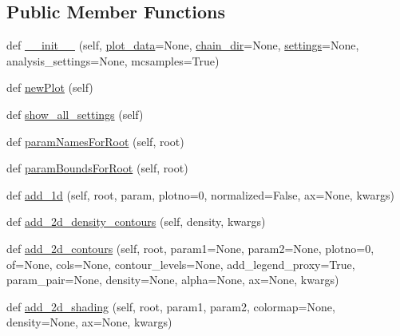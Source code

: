 \subsection*{Public Member Functions}
\begin{DoxyCompactItemize}
\item 
def \mbox{\hyperlink{classgetdist_1_1plots_1_1GetDistPlotter_a1d102ce35be5934c0f9e3d170939f1f9}{\+\_\+\+\_\+init\+\_\+\+\_\+}} (self, \mbox{\hyperlink{classgetdist_1_1plots_1_1GetDistPlotter_ad66ca82b7ceada3d0534123ac7d9c9b0}{plot\+\_\+data}}=None, \mbox{\hyperlink{classgetdist_1_1plots_1_1GetDistPlotter_a3bc2351d55e030f62382f5451d72f6dc}{chain\+\_\+dir}}=None, \mbox{\hyperlink{classgetdist_1_1plots_1_1GetDistPlotter_a6957d39a91cc48beffc359eae83aa214}{settings}}=None, analysis\+\_\+settings=None, mcsamples=True)
\item 
def \mbox{\hyperlink{classgetdist_1_1plots_1_1GetDistPlotter_a844cb0d8b1f652daf9b23267a470636c}{new\+Plot}} (self)
\item 
def \mbox{\hyperlink{classgetdist_1_1plots_1_1GetDistPlotter_af4832303ee4e0106314557a329153201}{show\+\_\+all\+\_\+settings}} (self)
\item 
def \mbox{\hyperlink{classgetdist_1_1plots_1_1GetDistPlotter_a556fd9e8f1a884ef8673cf58e64572af}{param\+Names\+For\+Root}} (self, root)
\item 
def \mbox{\hyperlink{classgetdist_1_1plots_1_1GetDistPlotter_a199664f84496268527d58072eebcd724}{param\+Bounds\+For\+Root}} (self, root)
\item 
def \mbox{\hyperlink{classgetdist_1_1plots_1_1GetDistPlotter_a2c75c431ff53d33697077671d1da1396}{add\+\_\+1d}} (self, root, param, plotno=0, normalized=False, ax=None, kwargs)
\item 
def \mbox{\hyperlink{classgetdist_1_1plots_1_1GetDistPlotter_aa778142d973eb5a21663b564743b77d6}{add\+\_\+2d\+\_\+density\+\_\+contours}} (self, density, kwargs)
\item 
def \mbox{\hyperlink{classgetdist_1_1plots_1_1GetDistPlotter_a0a51d5af908d2dc06b0e26d5bad61e89}{add\+\_\+2d\+\_\+contours}} (self, root, param1=None, param2=None, plotno=0, of=None, cols=None, contour\+\_\+levels=None, add\+\_\+legend\+\_\+proxy=True, param\+\_\+pair=None, density=None, alpha=None, ax=None, kwargs)
\item 
def \mbox{\hyperlink{classgetdist_1_1plots_1_1GetDistPlotter_a717cc70fba7ccf459cc880e6069f964b}{add\+\_\+2d\+\_\+shading}} (self, root, param1, param2, colormap=None, density=None, ax=None, kwargs)
\item 

\end{DoxyCompactItemize}
